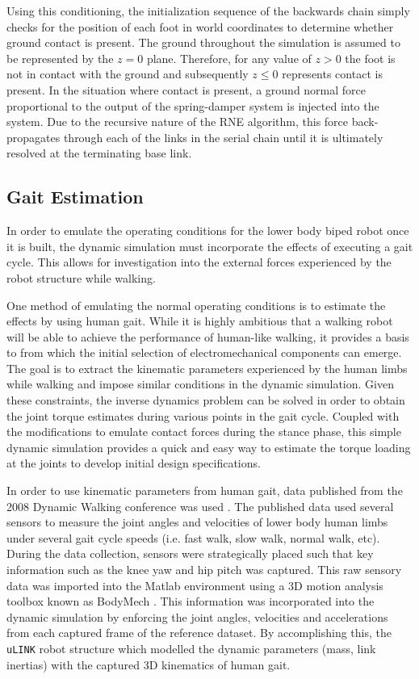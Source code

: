 Using this conditioning, the initialization sequence of the backwards chain simply checks for the position of each foot in world coordinates to determine whether ground contact is present. The ground throughout the simulation is assumed to be represented by the $z = 0$ plane. Therefore, for any value of $z > 0$ the foot is not in contact with the ground and subsequently $z \leq 0$ represents contact is present. In the situation where contact is present, a ground normal force proportional to the output of the spring-damper system is injected into the system. Due to the recursive nature of the RNE algorithm, this force back-propagates through each of the links in the serial chain until it is ultimately resolved at the terminating base link.


\subsection{Gait Estimation} %
\label{sec:gait_estimation}
	
In order to emulate the operating conditions for the lower body biped robot once it is built, the dynamic simulation must incorporate the effects of executing a gait cycle. This allows for investigation into the external  forces experienced by the robot structure while walking. 
	
One method of emulating the normal operating conditions is to estimate the effects by using human gait. While it is highly ambitious that a walking robot will be able to achieve the performance of human-like walking, it provides a basis to from which the initial selection of electromechanical components can emerge. The goal is to extract the kinematic parameters experienced by the human limbs while walking and impose similar conditions in the dynamic simulation. Given these constraints, the inverse dynamics problem can be solved in order to obtain the joint torque estimates during various points in the gait cycle. Coupled with the modifications to emulate contact forces during the stance phase, this simple dynamic simulation provides a quick and easy way to estimate the torque loading at the joints to develop initial design specifications. 
	
In order to use kinematic parameters from human gait, data published from the 2008 Dynamic Walking conference was used \cite{dw2008}. The published data used several sensors to measure the joint angles and velocities of lower body human limbs under several gait cycle speeds (i.e. fast walk, slow walk, normal walk, etc). During the data collection, sensors were strategically placed such that key information such as the knee yaw and hip pitch was captured. This raw sensory data was imported into the Matlab environment using a 3D motion analysis toolbox known as BodyMech \cite{bodymech}. This information was incorporated into the dynamic simulation by enforcing the joint angles, velocities and accelerations from each captured frame of the reference dataset. By accomplishing this, the \texttt{uLINK} robot structure which modelled the dynamic parameters (mass, link inertias) with the captured 3D kinematics of human gait. 


